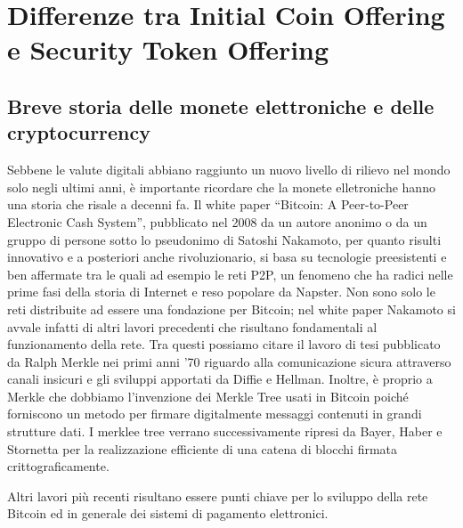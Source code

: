 \chapter{Differenze tra Initial Coin Offering e Security Token Offering}                %
\lhead[\fancyplain{}{\bfseries\thepage}]{\fancyplain{}{\bfseries\rightmark}}


\section{Breve storia delle monete elettroniche e delle cryptocurrency}

Sebbene le valute digitali abbiano raggiunto un nuovo livello di rilievo nel mondo solo negli ultimi anni, è importante ricordare che la monete elletroniche hanno una storia che risale a decenni fa. Il white paper “Bitcoin: A Peer-to-Peer Electronic Cash System”, pubblicato nel 2008 da un autore anonimo o da un gruppo di persone sotto lo pseudonimo di Satoshi Nakamoto, per quanto risulti innovativo e a posteriori anche rivoluzionario, si basa su tecnologie preesistenti e ben affermate tra le quali ad esempio le reti P2P, un fenomeno che ha radici nelle prime fasi della storia di Internet e reso popolare da Napster. Non sono solo le reti distribuite ad essere una fondazione per Bitcoin; nel white paper Nakamoto si avvale infatti di altri lavori precedenti che risultano fondamentali al funzionamento della rete. Tra questi possiamo citare il lavoro di tesi pubblicato da Ralph Merkle nei primi anni ’70  riguardo alla comunicazione sicura attraverso canali insicuri e gli sviluppi apportati da Diffie e Hellman. Inoltre, è proprio a Merkle che dobbiamo l’invenzione dei Merkle Tree usati in Bitcoin poiché forniscono un metodo per firmare digitalmente messaggi contenuti in grandi strutture dati. I merklee tree verrano successivamente ripresi da Bayer, Haber e Stornetta per la realizzazione efficiente di una catena di blocchi firmata crittograficamente.


Altri lavori più recenti risultano essere punti chiave per lo sviluppo della rete Bitcoin ed in generale dei sistemi di pagamento elettronici.



